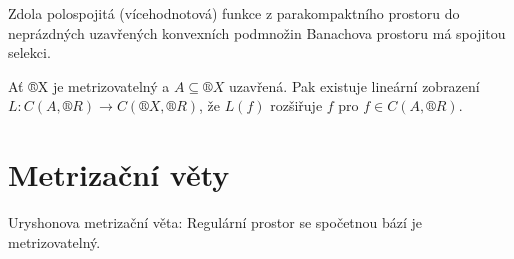 \documentclass[12pt]{article}                   %
\begin{document}
    \begin{veta}
        Zdola polospojitá (vícehodnotová) funkce z parakompaktního prostoru do neprázdných uzavřených konvexních podmnožin Banachova prostoru má spojitou selekci.
    \end{veta}

    \begin{veta}[Dugunjiho]
        Ať ®X je metrizovatelný a $A \subseteq ®X$ uzavřená. Pak existuje lineární zobrazení $L: C(A, ®R) \rightarrow C(®X, ®R)$, že $L(f)$ rozšiřuje $f$ pro $f \in C(A, ®R)$.
    \end{veta}

\section{Metrizační věty}
    \begin{poznamka}[Opakování]
        Uryshonova metrizační věta: Regulární prostor se spočetnou bází je metrizovatelný.
    \end{poznamka}
\end{document}
